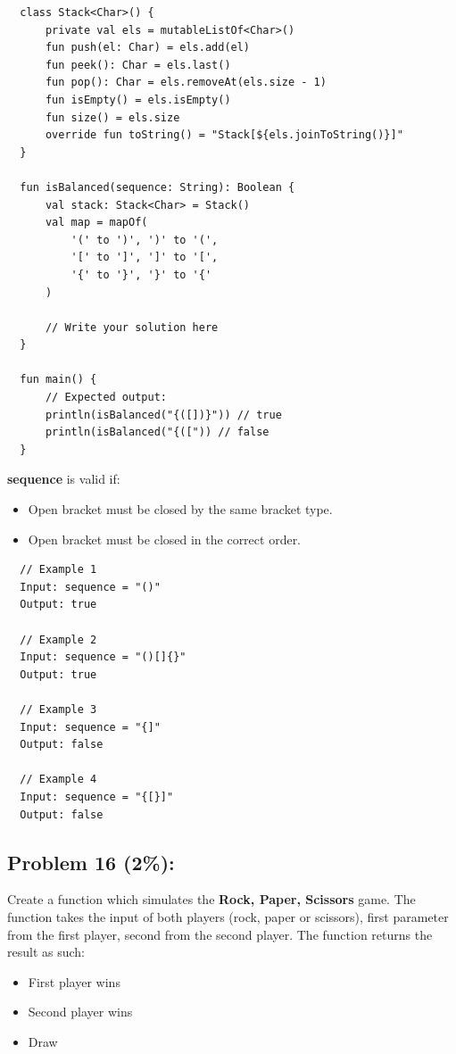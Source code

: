 \documentclass{article}
\begin{document}
\begin{verbatim}
  class Stack<Char>() {
      private val els = mutableListOf<Char>()
      fun push(el: Char) = els.add(el)
      fun peek(): Char = els.last()
      fun pop(): Char = els.removeAt(els.size - 1)
      fun isEmpty() = els.isEmpty()
      fun size() = els.size
      override fun toString() = "Stack[${els.joinToString()}]"
  }

  fun isBalanced(sequence: String): Boolean {
      val stack: Stack<Char> = Stack()
      val map = mapOf(
          '(' to ')', ')' to '(',
          '[' to ']', ']' to '[',
          '{' to '}', '}' to '{'
      )
      
      // Write your solution here
  }

  fun main() {
      // Expected output:
      println(isBalanced("{([])}")) // true
      println(isBalanced("{([")) // false
  }
\end{verbatim}

\textbf{sequence} is valid if:
\begin{itemize}
  \item Open bracket must be closed by the same bracket type.
  \item Open bracket must be closed in the correct order.
\end{itemize}

\begin{verbatim}
  // Example 1
  Input: sequence = "()"
  Output: true
  
  // Example 2
  Input: sequence = "()[]{}"
  Output: true
  
  // Example 3
  Input: sequence = "{]"
  Output: false

  // Example 4
  Input: sequence = "{[}]"
  Output: false
\end{verbatim}

\subsection*{Problem 16 (2\%):}
Create a function which simulates the \textbf{Rock, Paper, Scissors} game. The function takes the input of both players (rock, paper or scissors), first parameter from the first player, second from the second player. The function returns the result as such:

\begin{itemize}
  \item First player wins
  \item Second player wins
  \item Draw
\end{itemize}
\end{document}
